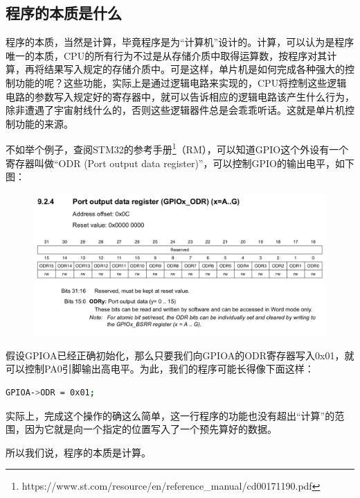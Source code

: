 \subsection{程序的本质是什么}
程序的本质，当然是计算，毕竟程序是为“计算机”设计的。计算，可以认为是程序唯一的本质，CPU的所有行为不过是从存储介质中取得运算数，按程序对其计算，再将结果写入规定的存储介质中。可是这样，单片机是如何完成各种强大的控制功能的呢？这些功能，实际上是通过逻辑电路来实现的，CPU将控制这些逻辑电路的参数写入规定好的寄存器中，就可以告诉相应的逻辑电路该产生什么行为，除非遭遇了宇宙射线什么的，否则这些逻辑器件总是会乖乖听话。这就是单片机控制功能的来源。
\par 
不如举个例子，查阅STM32的参考手册\footnote{https://www.st.com/resource/en/reference\_manual/cd00171190.pdf}（\ac{RM}），可以知道GPIO这个外设有一个寄存器叫做“ODR (Port output data register)”，可以控制GPIO的输出电平，如下图：
\par 
\begin{figure}[h]
	\includegraphics[width=\textwidth]{images/content/ODR.png}
	\label{odrReg}
\end{figure}
\par 
假设GPIOA已经正确初始化，那么只要我们向GPIOA的ODR寄存器写入0x01，就可以控制PA0引脚输出高电平。为此，我们的程序可能长得像下面这样：
\par 
\begin{lstlisting}[language=bash, style=customStyleC, caption=控制PA0输出高电平]
GPIOA->ODR = 0x01;
\end{lstlisting}
\par 
实际上，完成这个操作的确这么简单，这一行程序的功能也没有超出“计算”的范围，因为它就是向一个指定的位置写入了一个预先算好的数据。
\par 
所以我们说，程序的本质是计算。

